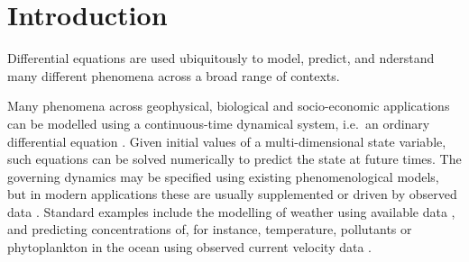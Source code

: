 
\chapter{Introduction}
Differential equations are used ubiquitously to model, predict, and nderstand many different phenomena across a broad range of contexts.


Many phenomena across geophysical, biological and socio-economic applications can be modelled using a continuous-time dynamical system, i.e.\ an ordinary differential equation \cite[e.g.]{BrauerCastillo-Chavez_2012_MathematicalModelsPopulation,TelEtAl_2005_ChemicalBiologicalActivity,Wiggins_2005_DynamicalSystemsApproach}.
Given initial values of a multi-dimensional state variable, such equations can be solved numerically to predict the state at future times.
The governing dynamics may be specified using existing phenomenological models, but in modern applications these are usually supplemented or driven by observed data \cite{LawEtAl_2015_DataAssimilationMathematical,ReichCotter_2015_ProbabilisticForecastingBayesian}.
Standard examples include the modelling of weather using available data \cite{LawEtAl_2015_DataAssimilationMathematical,ReichCotter_2015_ProbabilisticForecastingBayesian}, and predicting concentrations of, for instance, temperature, pollutants or phytoplankton in the ocean using observed current velocity data \cite{AbascalEtAl_2009_ApplicationHFRadar,dOvidioEtAl_2010_FluidDynamicalNiches}.




